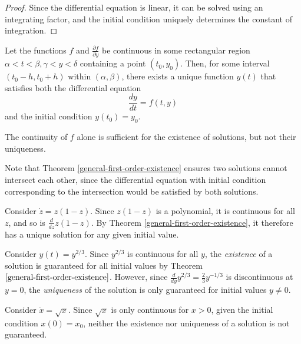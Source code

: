 \begin{proof}
    Since the differential equation is linear, it can be solved using an integrating factor, and the initial condition uniquely determines the constant of integration.
\end{proof}

\begin{thm}\label{general-first-order-existence}
    Let the functions $f$ and $\frac{\partial{f}}{\partial{y}}$ be continuous in some rectangular region $\alpha < t < \beta, \gamma < y < \delta$ containing a point $(t_0, y_0)$. Then, for some interval $(t_0 - h, t_0 + h)$ within $(\alpha, \beta)$, there exists a unique function $y(t)$ that satisfies both the differential equation
    \[\frac{dy}{dt} = f(t, y)\] and the initial condition $y(t_0) = y_0$.
\end{thm}

\begin{cor}
    The continuity of $f$ alone is sufficient for the existence of solutions, but not their uniqueness.
\end{cor}

\begin{rmk}
    Note that Theorem \ref{general-first-order-existence} ensures two solutions cannot intersect each other, since the differential equation with initial condition corresponding to the intersection would be satisfied by both solutions.
\end{rmk}

\begin{exmp}
    Consider $\dot{z} = z(1-z)$. Since $z(1-z)$ is a polynomial, it is continuous for all $z$, and so is $\frac{d}{dz}z(1-z)$. By Theorem \ref{general-first-order-existence}, it therefore has a unique solution for any given initial value.
\end{exmp}

\begin{exmp}
    Consider $y(t) = y^{2/3}$. Since $y^{2/3}$ is continuous for all $y$, the \emph{existence} of a solution is guaranteed for all initial values by Theorem $\ref{general-first-order-existence}$. However, since $\frac{d}{dy}y^{2/3} = \frac{2}{3}y^{-1/3}$ is discontinuous at $y = 0$, the \emph{uniqueness} of the solution is only guaranteed for initial values $y \neq 0$.
\end{exmp}

\begin{exmp}
    Consider $\dot{x} = \sqrt{x}$. Since $\sqrt{x}$ is only continuous for $x > 0$, given the initial condition $x(0) = x_0$, neither the existence nor uniqueness of a solution is not guaranteed.
\end{exmp}

